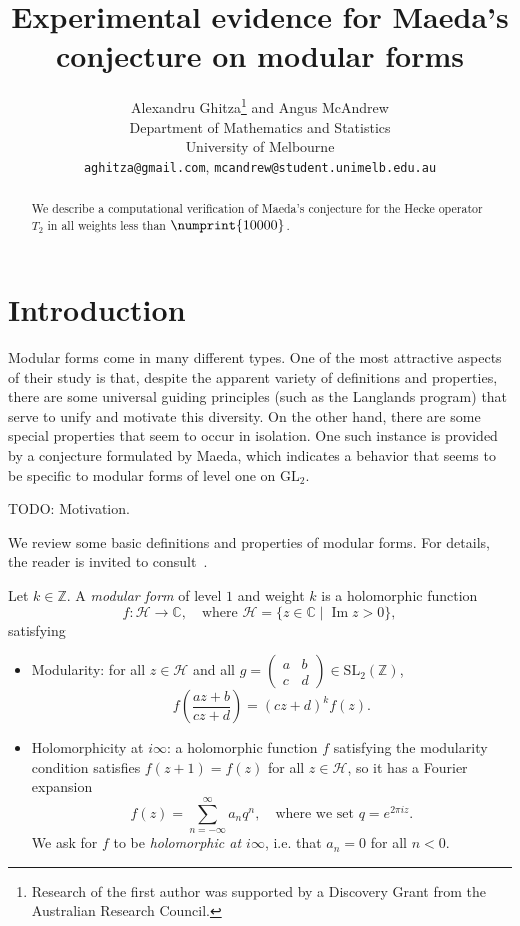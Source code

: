 \documentclass[11pt]{article}
\title{Experimental evidence for Maeda's conjecture on modular forms
}
\author{
Alexandru Ghitza\footnote{Research of the first author was supported by 
a Discovery Grant from the Australian Research Council.}  
{} and 
Angus McAndrew\\
Department of Mathematics and Statistics\\
University of Melbourne\\
{\tt aghitza@gmail.com}, {\tt mcandrew@student.unimelb.edu.au}
}
\date{}
\theoremstyle{plain}
\theoremstyle{definition}
\theoremstyle{remark}
\numberwithin{equation}{section}
\numberwithin{table}{section}
\newcommand{\longto}{\longrightarrow}
\newcommand{\CC}{\mathbb{C}}
\newcommand{\ZZ}{\mathbb{Z}}
\newcommand{\cH}{\mathcal{H}}
\renewcommand{\Im}{\operatorname{Im}}
\newcommand{\bound}{\numprint{10000}}
\newcommand{\GL}{\mathrm{GL}}
\newcommand{\SL}{\mathrm{SL}}
\begin{document}
\thispagestyle{empty}

\maketitle
\begin{abstract}
  We describe a computational verification of Maeda's conjecture for the Hecke
  operator $T_2$ in all weights less than $\bound$.
\end{abstract}


\section{Introduction}
Modular forms come in many different types.  One of the most attractive
aspects of their study is that, despite the apparent variety of definitions
and properties, there are some universal guiding principles (such as the
Langlands program) that serve to unify and motivate this diversity.  On the
other hand, there are some special properties that seem to occur in isolation.
One such instance is provided by a conjecture formulated by Maeda, which
indicates a behavior that seems to be specific to modular forms of level one
on $\GL_2$.  

TODO: Motivation.

We review some basic definitions and properties of modular forms.  For
details, the reader is invited to consult~\cite{Stein}.

Let $k\in\ZZ$.  A \emph{modular form} of level $1$ and weight $k$ is a
holomorphic function
\begin{equation*}
  f\colon\cH\longto\CC, \quad\text{where }
  \cH=\{z\in\CC\mid \Im z>0\},
\end{equation*}
satisfying
\begin{itemize}
  \item Modularity: for all $z\in\cH$ and all
    $g=\left(\begin{smallmatrix}a&b\\c&d\end{smallmatrix}\right)\in\SL_2(\ZZ)$,
      \begin{equation*}
        f\left(\frac{az+b}{cz+d}\right)=(cz+d)^kf(z).
      \end{equation*}
  \item Holomorphicity at $i\infty$: a holomorphic function $f$ satisfying the
    modularity condition satisfies $f(z+1)=f(z)$ for all $z\in\cH$, so it has
    a Fourier expansion
    \begin{equation*}
      f(z)=\sum_{n=-\infty}^\infty a_nq^n,\quad\text{where we set }
      q=e^{2\pi i z}.
    \end{equation*}
    We ask for $f$ to be \emph{holomorphic at $i\infty$}, i.e. that $a_n=0$
    for all $n<0$.
\end{itemize}
\end{document}
